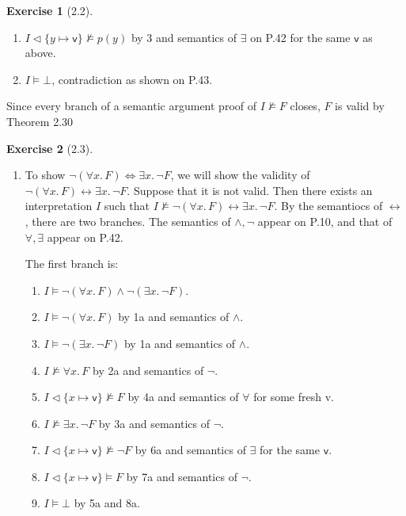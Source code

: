 \documentclass[12pt, psamsfonts]{amsart}
\theoremstyle{definition}
\newtheorem*{exer}{Exercise}
\theoremstyle{remark}
\numberwithin{equation}{subsection}
\begin{document}
\begin{exer}[2.2]
\begin{enumerate}[label=(\alph*)]
\begin{enumerate}[label=\arabic*.]
               \item %
                   $I \vartriangleleft \{ y \mapsto \textsf{v} \} \not\models p(y)$ by 3 and semantics of $\exists$ on P.42 for the same $\textsf{v}$ as above.
               \item %
                   $I \models \bot$, contradiction as shown on P.43.
           \end{enumerate}
           Since every branch of a semantic argument proof of $I \not\models F$ closes, $F$ is valid by Theorem 2.30
    \end{enumerate}
\end{exer}

\begin{exer}[2.3]
    $ $
    \begin{enumerate}[label=(\alph*)]
        \item
            To show $\neg(\forall x.\, F) \Leftrightarrow \exists x.\, \neg F$, we will show the validity of $\neg(\forall x.\, F) \leftrightarrow \exists x.\, \neg F$.
            Suppose that it is not valid.
            Then there exists an interpretation $I$ such that $I \not\models \neg(\forall x.\, F) \leftrightarrow \exists x.\, \neg F$.
            By the semantiocs of $\leftrightarrow$, there are two branches.
            The semantics of $\land, \neg$ appear on P.10, and that of $\forall, \exists$ appear on P.42.

            The first branch is:
            \begin{enumerate}[label=\arabic*a.]
                \item %
                    $I \models \neg(\forall x.\, F) \land \neg(\exists x.\, \neg F)$.
                \item %
                    $I \models \neg(\forall x.\, F)$ by 1a and semantics of $\land$.
                \item %
                    $I \models \neg(\exists x.\, \neg F)$ by 1a and semantics of $\land$.
                \item %
                    $I \not\models \forall x.\, F$ by 2a and semantics of $\neg$.
                \item %
                    $I \vartriangleleft \{ x \mapsto \textsf{v} \} \not\models F$ by 4a and semantics of $\forall$ for some fresh \textsf{v}.
                \item %
                    $I \not \models \exists x.\, \neg F$ by 3a and semantics of $\neg$.
                \item %
                    $I \vartriangleleft \{ x \mapsto \textsf{v} \} \not\models \neg F$ by 6a and semantics of $\exists$ for the same $\textsf{v}$.
                \item %
                    $I \vartriangleleft \{ x \mapsto \textsf{v} \} \models F$ by 7a and semantics of $\neg$.
                \item %
                    $I \models \bot$ by 5a and 8a.
            \end{enumerate}


\end{enumerate}
\end{exer}
\end{document}
